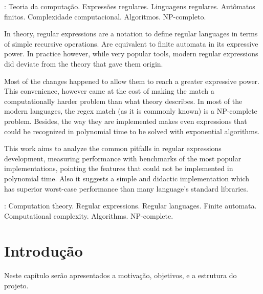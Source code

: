 \documentclass[a4paper,12pt,oneside,onecolumn]{uerj}
\begin{document}
: Teoria da computação. Expressões regulares. Linguagens regulares. Autômatos finitos. Complexidade computacional. Algoritmos. NP-completo.



In theory, regular expressions are a notation to define regular languages in terms of simple recursive operations. Are equivalent to finite automata in its expressive power. In practice however, while very popular tools, modern regular expressions did deviate from the theory that gave them origin.

Most of the changes happened to allow them to reach a greater expressive power. This convenience, however came at the cost of making the match a computationally harder problem than what theory describes. In most of the modern languages, the regex match (as it is commonly known) is a NP-complete problem. Besides, the way they are implemented makes even expressions that could be recognized in polynomial time to be solved with exponential algorithms.

This work aims to analyze the common pitfalls in regular expressions development, measuring performance with benchmarks of the most popular implementations, pointing the features that could not be implemented in polynomial time. Also it suggests a simple and didactic implementation which has superior worst-case performance than many language's standard libraries.

: Computation theory. Regular expressions. Regular languages. Finite automata. Computational complexity. Algorithms. NP-complete.

\listadefiguras

\sumario

\mainmatter

\chapter{Introdução}

Neste capítulo serão apresentados a motivação, objetivos, e a estrutura do projeto.

\end{document}
